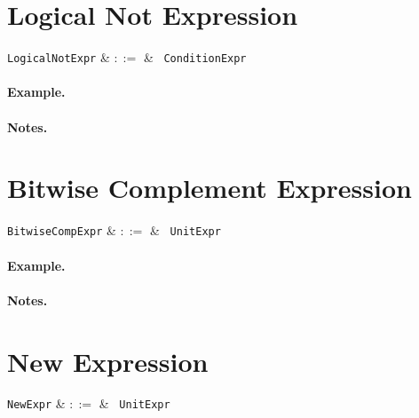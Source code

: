 \section{Logical Not Expression}
\label{c_expr_logical_not}

\begin{syntax}
\verb+LogicalNotExpr+ & $::=$ & \token{!}\ \verb+ConditionExpr+\\
\end{syntax}

\paragraph{Example.}

\paragraph{Notes.}


\section{Bitwise Complement Expression}
\label{c_expr_bitwise_complement}

\begin{syntax}
\verb+BitwiseCompExpr+ & $::=$ & \token{~}\ \verb+UnitExpr+\\
\end{syntax}

\paragraph{Example.}

\paragraph{Notes.}


\section{New Expression}
\label{c_expr_new}

\begin{syntax}
\verb+NewExpr+ & $::=$ & \ \verb+UnitExpr+\\
\end{syntax}

